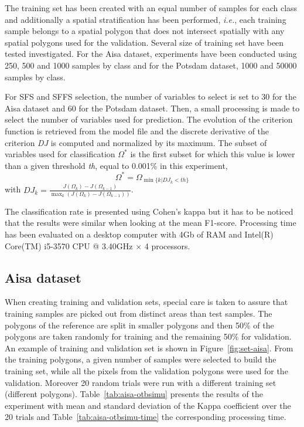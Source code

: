 \documentclass[journal]{IEEEtran}
\begin{document}
    The training set has been created  with an equal number of samples
    for each class and additionally  a spatial stratification has been
    performed, \emph{i.e.}, each training  sample belongs to a spatial
    polygon  that  does  not  intersect  spatially  with  any  spatial
    polygons used  for the validation.   Several size of  training set
    have been tested investigated.   For the Aisa dataset, experiments
    have been conducted  using 250, 500 and 1000 samples  by class and
    for the Potsdam dataset, 1000 and 50000 samples by class.

    For SFS and  SFFS selection, the number of variables to select is set to 30 for the Aisa dataset and 60 for the Potsdam dataset. Then, a small processing is made to select the number of variables used for prediction. The evolution of the criterion function is retrieved from the model file and the discrete derivative of the criterion \emph{DJ} is computed and normalized by its maximum. The subset of variables used for classification $\Omega^{*}$ is the first subset for which this value is lower than a given threshold \emph{th}, equal  to 0.001\% in this experiment,
    \begin{equation*}
        \Omega^{*} = \Omega_{\min \{k|DJ_k<th\}}
    \end{equation*}
    with $DJ_k = \frac{J(\Omega_k) - J(\Omega_{k-1})}{\max_k (J(\Omega_k) - J(\Omega_{k-1}))}$.

    The classification  rate is presented  using Cohen's kappa  but it
    has to  be noticed that the  results were  similar when looking  at the
    mean F1-score.  Processing time  has been  evaluated on  a desktop
    computer  with 4Gb  of RAM  and  Intel(R) Core(TM)  i5-3570 CPU  @
    3.40GHz $\times$ 4 processors.

    \subsection{Aisa dataset}
    \label{sec:aisa}

    When creating training and validation  sets, special care is taken
    to assure that training samples are picked out from distinct areas
    than test  samples.  The  polygons of the  reference are  split in
    smaller polygons and then 50\%  of the polygons are taken randomly
    for training and the remaining 50\% for validation.  An example of
    training      and     validation      set     is      shown     in
    Figure~\ref{fig:set-aisa}.  From the  training  polygons, a  given
    number of samples  were selected to build the  training set, while
    all  the pixels  from the  validation polygons  were used  for the
    validation.  Moreover 20  random trials were run  with a different
    training  set (different  polygons).  Table~\ref{tab:aisa-otbsimu}
    presents  the results  of the  experiment with  mean and  standard
    deviation  of  the  Kappa  coefficient  over  the  20  trials  and
    Table~\ref{tab:aisa-otbsimu-time}  the   corresponding  processing
    time.
\end{document}
